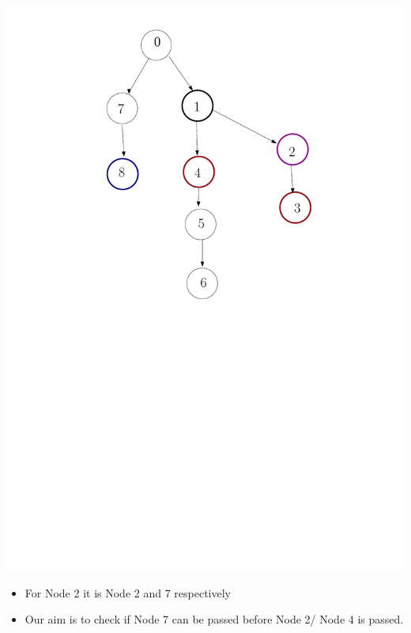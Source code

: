 \documentclass[12pt]{beamer}
\begin{document}
\begin{frame}[plain]
  \includegraphics[scale=0.3]{start3.pdf}
  \begin{itemize}
  \item For Node 2 it is Node 2 and 7 respectively
  \item Our aim is to check if Node 7 can be passed before Node 2/ Node 4 is passed.
  \end{itemize}
\end{frame}
\end{document}
